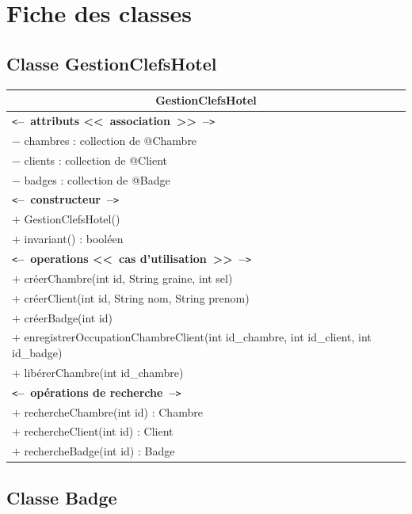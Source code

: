 \documentclass[11pt,article]{article}
\newcommand{\cmt}[1]{\texttt{<}\textbf{--~#1~--}\texttt{>}}
\begin{document}
\clearpage
\newpage

\section{Fiche des classes}

\subsection{Classe \textsf{GestionClefsHotel}}

\begin{center}
\begin{longtable}{|p{15cm}|}
\hline
\multicolumn{1}{|c|}{{\Large \textsf{GestionClefsHotel}}} \\
\hline
\cmt{attributs <<~association~>>}\\
$-$ chambres : collection de @Chambre \\
$-$ clients : collection de @Client \\
$-$ badges : collection de @Badge \\
\hline
\cmt{constructeur} \\
$+$ GestionClefsHotel()\\
$+$ invariant() : booléen\\
\cmt{operations <<~cas d'utilisation~>>} \\
$+$ créerChambre(int id, String graine, int sel) \\
$+$ créerClient(int id, String nom, String prenom) \\
$+$ créerBadge(int id) \\
$+$ enregistrerOccupationChambreClient(int id\_chambre, int id\_client, int id\_badge) \\
$+$ libérerChambre(int id\_chambre) \\
\cmt{opérations de recherche} \\
$+$ rechercheChambre(int id) : Chambre \\
$+$ rechercheClient(int id) : Client\\
$+$ rechercheBadge(int id) : Badge\\
\hline
\end{longtable}%
\end{center}

\subsection{Classe \textsf{Badge}}
\end{document}
